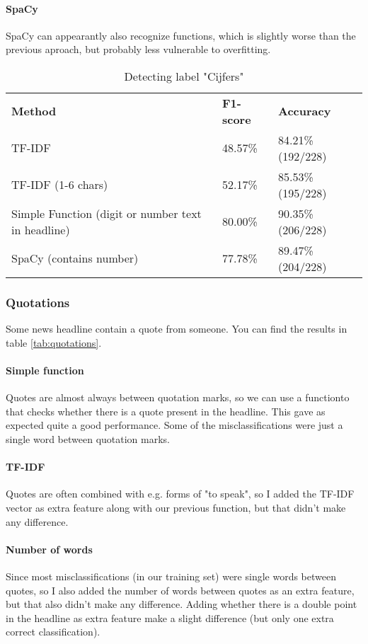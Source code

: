 \documentclass{article}
\begin{document}
\paragraph{SpaCy} SpaCy can appearantly also recognize functions, which is slightly worse than the previous aproach, but probably less vulnerable to overfitting.

\begin{table}[]
\begin{tabular}{lll}
\textbf{Method}                                    & \textbf{F1-score} & \textbf{Accuracy} \\
TF-IDF                                             & 48.57\%           & 84.21\% (192/228) \\
TF-IDF (1-6 chars)                                 & 52.17\%           & 85.53\% (195/228) \\
Simple Function (digit or number text in headline) & 80.00\%           & 90.35\% (206/228) \\
SpaCy (contains number)                            & 77.78\%           & 89.47\% (204/228)
\end{tabular}
\caption{Detecting label "Cijfers"}
\label{tab:numbers}
\end{table}


\subsubsection{Quotations}
Some news headline contain a quote from someone. You can find the results in table \ref{tab:quotations}.

\paragraph{Simple function}
Quotes are almost always between quotation marks, so we can use a functionto that checks whether there is a quote present in the headline. This gave as expected quite a good performance. Some of the misclassifications were just a single word between quotation marks.

\paragraph{TF-IDF} Quotes are often combined with e.g. forms of "to speak", so I added the TF-IDF vector as extra feature along with our previous function, but that didn't make any difference.

\paragraph{Number of words} Since most misclassifications (in our training set) were single words between quotes, so I also added the number of words between quotes as an extra feature, but that also didn't make any difference. Adding whether there is a double point in the headline as extra feature make a slight difference (but only one extra correct classification).
\end{document}
